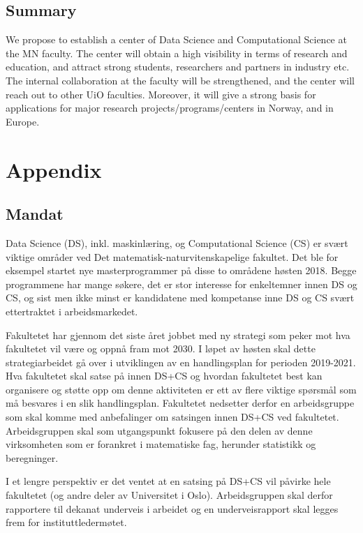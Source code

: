 \documentclass[a4paper,10pt]{article}
\begin{document}
\subsection{Summary}

We propose to establish a center of Data Science and Computational Science at the MN faculty. The center will obtain a high visibility in terms of  research and education, and attract strong students, researchers and partners in industry etc. The internal collaboration at the faculty will be strengthened, and the center will reach out to other UiO faculties. Moreover,  it will give a strong basis for applications for major research projects/programs/centers in Norway, and in Europe. 




\newpage
\appendix
\section{Appendix}
\subsection{Mandat}\label{ap:mandat}

Data Science (DS), inkl. maskinlæring, og Computational Science (CS) er svært viktige
områder ved Det matematisk-naturvitenskapelige fakultet. Det ble for eksempel startet
nye masterprogrammer på disse to områdene høsten 2018. Begge programmene har mange
søkere, det er stor interesse for enkeltemner innen DS og CS, og sist men ikke minst er
kandidatene med kompetanse inne DS og CS svært ettertraktet i arbeidsmarkedet.

Fakultetet har gjennom det siste året jobbet med ny strategi som peker mot hva
fakultetet vil være og oppnå fram mot 2030. I løpet av høsten skal dette strategiarbeidet
gå over i utviklingen av en handlingsplan for perioden 2019-2021. Hva fakultetet skal satse
på innen DS+CS og hvordan fakultetet best kan organisere og støtte opp om denne
aktiviteten er ett av flere viktige spørsmål som må besvares i en slik handlingsplan.
Fakultetet nedsetter derfor en arbeidsgruppe som skal komme med anbefalinger om
satsingen innen DS+CS ved fakultetet. Arbeidsgruppen skal som utgangspunkt fokusere
på den delen av denne virksomheten som er forankret i matematiske fag, herunder
statistikk og beregninger.

I et lengre perspektiv er det ventet at en satsing på DS+CS vil påvirke hele fakultetet (og
andre deler av Universitet i Oslo). Arbeidsgruppen skal derfor rapportere til dekanat
underveis i arbeidet og en underveisrapport skal legges frem for instituttledermøtet.
\end{document}
